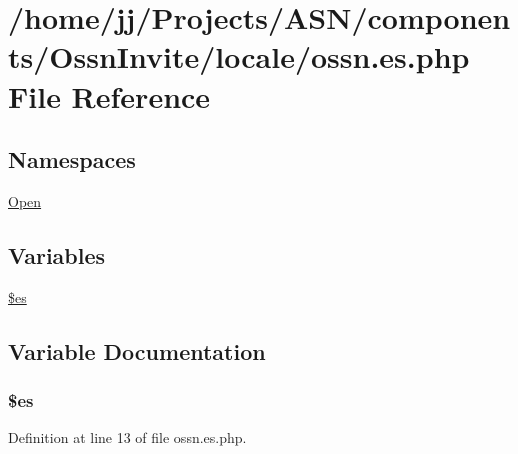 \hypertarget{components_2_ossn_invite_2locale_2ossn_8es_8php}{}\section{/home/jj/\+Projects/\+A\+S\+N/components/\+Ossn\+Invite/locale/ossn.es.\+php File Reference}
\label{components_2_ossn_invite_2locale_2ossn_8es_8php}
\subsection*{Namespaces}
\begin{DoxyCompactItemize}
\item 
 \hyperlink{namespace_open}{Open}
\end{DoxyCompactItemize}
\subsection*{Variables}
\begin{DoxyCompactItemize}
\item 
\hyperlink{components_2_ossn_invite_2locale_2ossn_8es_8php_a388cbda27103d2baee3997798d1f2744}{\$es}
\end{DoxyCompactItemize}


\subsection{Variable Documentation}
\subsubsection[{\texorpdfstring{\$es}{$es}}]{\setlength{\rightskip}{0pt plus 5cm}\$es}\hypertarget{components_2_ossn_invite_2locale_2ossn_8es_8php_a388cbda27103d2baee3997798d1f2744}{}\label{components_2_ossn_invite_2locale_2ossn_8es_8php_a388cbda27103d2baee3997798d1f2744}


Definition at line 13 of file ossn.\+es.\+php.


